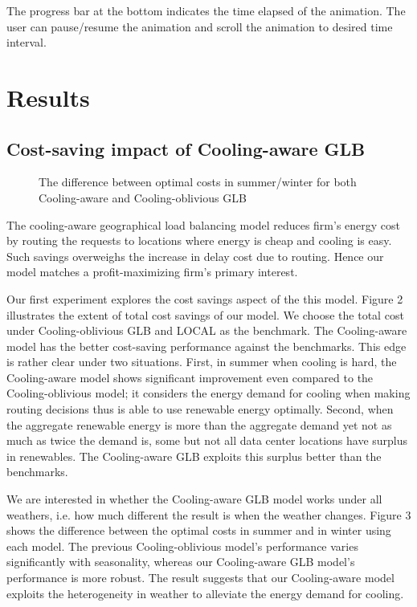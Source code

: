 \documentclass{acm_proc_article-sp}
\begin{document}
The progress bar at the bottom indicates the time elapsed of the animation. The user can pause/resume the animation and scroll the animation to desired time interval.


\section{Results}
\subsection{Cost-saving impact of Cooling-aware GLB}

\begin{figure}
\centering
{}
\caption{The difference between optimal costs in summer/winter for both Cooling-aware and Cooling-oblivious GLB}
\end{figure}

The cooling-aware geographical load balancing model reduces firm's energy cost by routing the requests to locations where energy is cheap and cooling is easy. Such savings overweighs the increase in delay cost due to routing. Hence our model matches a profit-maximizing firm's primary interest.


Our first experiment explores the cost savings aspect of the this model. Figure 2 illustrates the extent of total cost savings of our model. We choose the total cost under Cooling-oblivious GLB and LOCAL as the benchmark. The Cooling-aware model has the better cost-saving performance against the benchmarks. This edge is rather clear under two situations. First, in summer when cooling is hard, the Cooling-aware model shows significant improvement even compared to the Cooling-oblivious model; it considers the energy demand for cooling when making routing decisions thus is able to use renewable energy optimally. Second, when the aggregate renewable energy is more than the aggregate demand yet not as much as twice the demand is, some but not all data center locations have surplus in renewables. The Cooling-aware GLB exploits this surplus better than the benchmarks.

We are interested in whether the Cooling-aware GLB model works under all weathers, i.e. how much different the result is when the weather changes. Figure 3 shows the difference between the optimal costs in summer and in winter using each model. The previous Cooling-oblivious model's performance varies significantly with seasonality, whereas our Cooling-aware GLB model's performance is more robust. The result suggests that our Cooling-aware model exploits the heterogeneity in weather to alleviate the energy demand for cooling.
\end{document}
